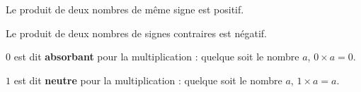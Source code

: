 
\begin{prop}{}{}
\noindent Le produit de deux nombres de même signe est positif.

\noindent Le produit de deux nombres de signes contraires est négatif.
\end{prop}



\begin{rem}{}{}
\noindent $0$ est dit \textbf{absorbant} pour la multiplication : \quad quelque soit le nombre $a$, $0\times a=0$.

\noindent $1$ est dit \textbf{neutre} pour la multiplication : \quad quelque soit le nombre $a$, $1\times a= a$.
\end{rem}


